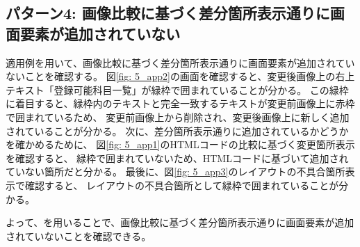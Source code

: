 \subsection{パターン4: 画像比較に基づく差分箇所表示通りに画面要素が追加されていない}\label{sec:result_area4}
適用例を用いて、画像比較に基づく差分箇所表示通りに画面要素が追加されていないことを確認する。
図\ref{fig: 5_app2}の画面を確認すると、変更後画像上の右上テキスト「登録可能科目一覧」が緑枠で囲まれていることが分かる。
この緑枠に着目すると、緑枠内のテキストと完全一致するテキストが変更前画像上に赤枠で囲まれているため、
変更前画像上から削除され、変更後画像上に新しく追加されていることが分かる。
次に、差分箇所表示通りに追加されているかどうかを確かめるために、
図\ref{fig: 5_app1}のHTMLコードの比較に基づく変更箇所表示を確認すると、
緑枠で囲まれていないため、HTMLコードに基づいて追加されていない箇所だと分かる。
最後に、図\ref{fig: 5_app3}のレイアウトの不具合箇所表示で確認すると、
レイアウトの不具合箇所として緑枠で囲まれていることが分かる。
\par
よって、\toolName を用いることで、画像比較に基づく差分箇所表示通りに画面要素が追加されていないことを確認できる。





